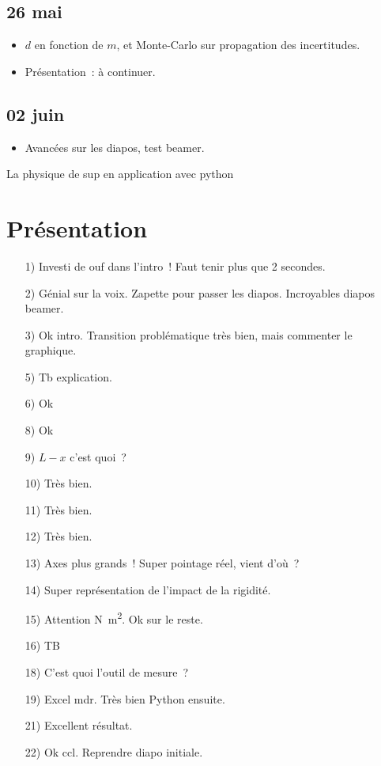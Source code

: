 \documentclass[a4paper, 11pt, final, garamond]{book}
\begin{document}
\subsection{26 mai}
\begin{itemize}
  \item $d$ en fonction de $m$, et Monte-Carlo sur propagation des incertitudes.
  \item Présentation~: à continuer.
\end{itemize}

\subsection{02 juin}
\begin{itemize}
  \item Avancées sur les diapos, test beamer.
\end{itemize}

La physique de sup en application avec python

\section{Présentation}

\begin{enumerate}
  \item[1)] Investi de ouf dans l'intro~! Faut tenir plus que 2 secondes.
  \item[2)] Génial sur la voix. Zapette pour passer les diapos. Incroyables
    diapos beamer.
  \item[3)] Ok intro. Transition problématique très bien, mais commenter le
    graphique.
  \item[5)] Tb explication.
  \item[6)] Ok
  \item[8)] Ok
  \item[9)] $L-x$ c'est quoi~?
  \item[10)] Très bien.
  \item[11)] Très bien.
  \item[12)] Très bien.
  \item[13)] Axes plus grands~! Super pointage réel, vient d'où~?
  \item[14)] Super représentation de l'impact de la rigidité.
  \item[15)] Attention \si{N.m^2}. Ok sur le reste.
  \item[16)] TB
  \item[18)] C'est quoi l'outil de mesure~?
  \item[19)] Excel mdr. Très bien Python ensuite.
  \item[21)] Excellent résultat.
  \item[22)] Ok ccl. Reprendre diapo initiale.
\end{enumerate}
\end{document}
